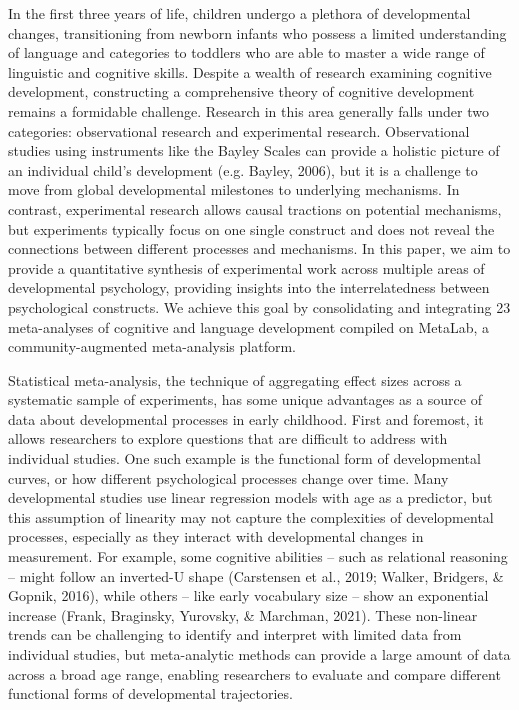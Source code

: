 \documentclass[10pt, letterpaper]{article}
\begin{document}
In the first three years of life, children undergo a plethora of
developmental changes, transitioning from newborn infants who possess a
limited understanding of language and categories to toddlers who are
able to master a wide range of linguistic and cognitive skills. Despite
a wealth of research examining cognitive development, constructing a
comprehensive theory of cognitive development remains a formidable
challenge. Research in this area generally falls under two categories:
observational research and experimental research. Observational studies
using instruments like the Bayley Scales can provide a holistic picture
of an individual child's development (e.g. Bayley, 2006), but it is a
challenge to move from global developmental milestones to underlying
mechanisms. In contrast, experimental research allows causal tractions
on potential mechanisms, but experiments typically focus on one single
construct and does not reveal the connections between different
processes and mechanisms. In this paper, we aim to provide a
quantitative synthesis of experimental work across multiple areas of
developmental psychology, providing insights into the interrelatedness
between psychological constructs. We achieve this goal by consolidating
and integrating 23 meta-analyses of cognitive and language development
compiled on MetaLab, a community-augmented meta-analysis platform.

Statistical meta-analysis, the technique of aggregating effect sizes
across a systematic sample of experiments, has some unique advantages as
a source of data about developmental processes in early childhood. First
and foremost, it allows researchers to explore questions that are
difficult to address with individual studies. One such example is the
functional form of developmental curves, or how different psychological
processes change over time. Many developmental studies use linear
regression models with age as a predictor, but this assumption of
linearity may not capture the complexities of developmental processes,
especially as they interact with developmental changes in measurement.
For example, some cognitive abilities -- such as relational reasoning --
might follow an inverted-U shape (Carstensen et al., 2019; Walker,
Bridgers, \& Gopnik, 2016), while others -- like early vocabulary size
-- show an exponential increase (Frank, Braginsky, Yurovsky, \&
Marchman, 2021). These non-linear trends can be challenging to identify
and interpret with limited data from individual studies, but
meta-analytic methods can provide a large amount of data across a broad
age range, enabling researchers to evaluate and compare different
functional forms of developmental trajectories.
\end{document}
